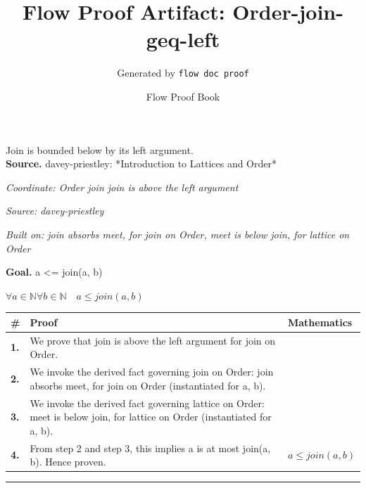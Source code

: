 \documentclass[11pt]{article}
\title{Flow Proof Artifact: Order-join-geq-left}
\author{Generated by \texttt{flow doc proof}}
\date{Flow Proof Book}
\theoremstyle{definition}
\begin{document}
\maketitle
Join is bounded below by its left argument.\\[0.5em]
\textbf{Source.} davey-priestley: *Introduction to Lattices and Order*\\[0.5em]
\bigskip
{}\par
\smallskip\noindent\textit{Coordinate: Order \cdot join \cdot join is above the left argument}\par
\smallskip\noindent\textit{Source: davey-priestley}\par
\smallskip\noindent\textit{Built on: join absorbs meet, for join on Order, meet is below join, for lattice on Order}\par
\medskip
\noindent\textbf{Goal.} a <= join(a, b)\par
\noindent$\displaystyle \forall a \in \mathbb{N} \forall b \in \mathbb{N}\quad a \le join(a, b)$\par
\medskip
\noindent
\begin{tabular}{@{} >{\raggedright\arraybackslash}p{} >{\raggedright\arraybackslash}p{} >{\raggedleft\arraybackslash}p{} @{}}
\textbf{\#} & \textbf{Proof} & \textbf{Mathematics} \\
\midrule
\textbf{1.} & We prove that join is above the left argument for join on Order. & \\[0.45em]
\textbf{2.} & We invoke the derived fact governing join on Order: join absorbs meet, for join on Order (instantiated for a, b). & \\[0.45em]
\textbf{3.} & We invoke the derived fact governing lattice on Order: meet is below join, for lattice on Order (instantiated for a, b). & \\[0.45em]
\textbf{4.} & From step 2 and step 3, this implies a is at most join(a, b). Hence proven. & $\displaystyle a \le join(a, b)$ \\[0.45em]
\bottomrule
\end{tabular}
\label{thm:Order-join-join_is_above_the_left_argument}
\par\medskip\hrule
\end{document}
